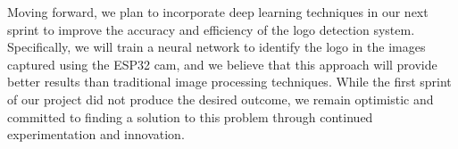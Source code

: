 Moving forward, we plan to incorporate deep learning techniques in our next sprint to improve the accuracy and efficiency of the logo detection system. Specifically, we will train a neural network to identify the logo in the images captured using the ESP32 cam, and we believe that this approach will provide better results than traditional image processing techniques. While the first sprint of our project did not produce the desired outcome, we remain optimistic and committed to finding a solution to this problem through continued experimentation and innovation.
\newpage

%




%